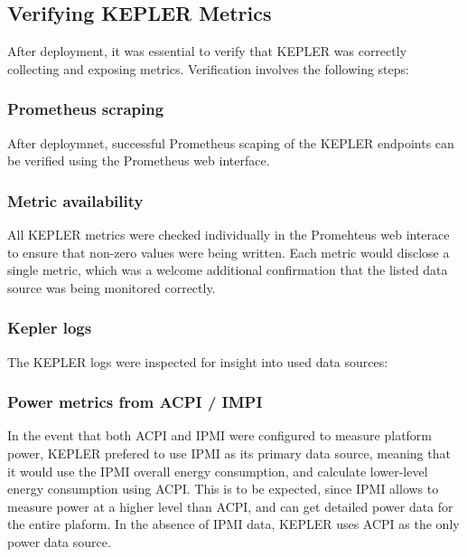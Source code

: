 \subsection{Verifying KEPLER Metrics}

After deployment, it was essential to verify that KEPLER was correctly collecting and exposing metrics. Verification involves the following steps:

\subsubsection{Prometheus scraping}

After deploymnet, successful Prometheus scaping of the KEPLER endpoints can be verified using the Prometheus web interface. 

\subsubsection{Metric availability}

All KEPLER metrics were checked individually in the Promehteus web interace to ensure that non-zero values were being written. Each metric would disclose a single metric, which was a welcome additional confirmation that the listed data source was being monitored correctly.

\subsubsection{Kepler logs} 

The KEPLER logs were inspected for insight into used data sources:


\subsubsection{Power metrics from ACPI / IMPI}

In the event that both ACPI and IPMI were configured to measure platform power, KEPLER prefered to use IPMI as its primary data source, meaning that it would use the IPMI overall energy consumption, and calculate lower-level energy consumption using ACPI. This is to be expected, since IPMI allows to measure power at a higher level than ACPI, and can get detailed power data for the entire plaform. In the absence of IPMI data, KEPLER uses ACPI as the only power data source. 

